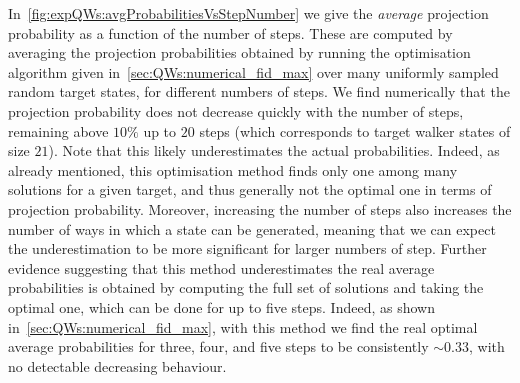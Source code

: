 In~\cref{fig:expQWs:avgProbabilitiesVsStepNumber} we give the \textit{average} projection probability as a function of the number of steps.
These are computed by averaging the projection probabilities obtained by running the optimisation algorithm given in~\cref{sec:QWs:numerical_fid_max} over many uniformly sampled random target states, for different numbers of steps.
We find numerically that the projection probability does not decrease quickly with the number of steps, remaining above $10\%$ up to $20$ steps (which corresponds to target walker states of size $21$).
Note that this likely underestimates the actual probabilities. Indeed, as already mentioned, this optimisation method finds only one among many solutions for a given target, and thus generally not the optimal one in terms of projection probability. Moreover, increasing the number of steps also increases the number of ways in which a state can be generated, meaning that we can expect the underestimation to be more significant for larger numbers of step.
Further evidence suggesting that this method underestimates the real average probabilities is obtained by computing the full set of solutions and taking the optimal one, which can be done for up to five steps. Indeed, as shown in~\cref{sec:QWs:numerical_fid_max}, with this method we find the real optimal average probabilities for three, four, and five steps to be consistently $\sim 0.33$, with no detectable decreasing behaviour.

